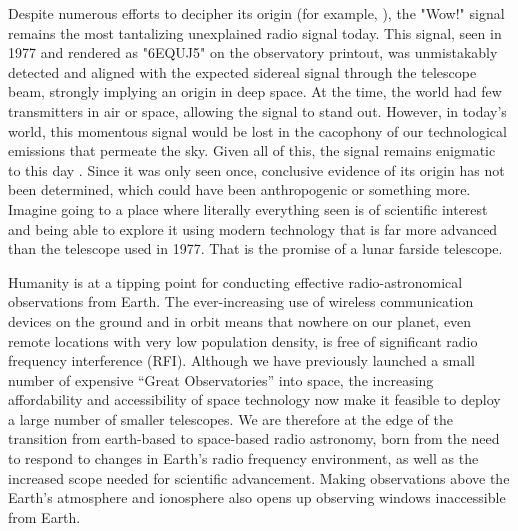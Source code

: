 Despite numerous efforts to decipher its origin (for example, \citealt{Wow_2024}), the "Wow!" signal  \citep{wow}  remains the most tantalizing unexplained radio signal today. This signal, seen in 1977 and rendered as "6EQUJ5" on the observatory printout, was unmistakably detected and aligned with the expected sidereal signal through the telescope beam, strongly implying an origin in deep space. At the time, the world had few transmitters in air or space, allowing the signal to stand out. However, in today's world, this momentous signal would be lost in the cacophony of our technological emissions that permeate the sky. Given all of this, the signal remains enigmatic to this day \citep{Saide_2023,Haqq_2025,Sheikh_2025}. Since it was only seen once, conclusive evidence of its origin has not been determined, which could have been anthropogenic or something more. Imagine going to a place where literally everything seen is of scientific interest and being able to explore it using modern technology that is far more advanced than the telescope used in 1977.   That is the promise of a lunar farside telescope.

Humanity is at a tipping point for conducting effective radio-astronomical observations from Earth. The ever-increasing use of wireless communication devices on the ground and in orbit means that nowhere on our planet, even remote locations with very low population density, is free of significant radio frequency interference (RFI). Although we have previously launched a small number of expensive ``Great Observatories'' into space, the increasing affordability and accessibility of space technology now make it feasible to deploy a large number of smaller telescopes. We are therefore at the edge of the transition from earth-based to space-based radio astronomy, born from the need to respond to changes in Earth's radio frequency environment, as well as the increased scope needed for scientific advancement. Making observations above the Earth's atmosphere and ionosphere also opens up observing windows inaccessible from Earth.


